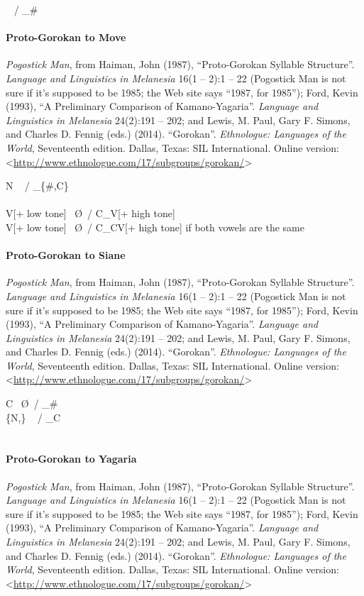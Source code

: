 \documentclass[11pt]{article}
\newcommand{\ipa}{\textipa}
\newcommand{\change}{\textrightarrow}
\begin{document}
\ipa{r} \change\ \ipa{P} / _\#

\paragraph{Proto-Gorokan to Move}{\it Pogostick Man}, from Haiman, John (1987), ``Proto-Gorokan Syllable Structure''. {\it Language and Linguistics in Melanesia} 16(1 -- 2):1 -- 22 (Pogostick Man is not sure if it's supposed to be 1985; the Web site says ``1987, for 1985''); Ford, Kevin (1993), ``A Preliminary Comparison of Kamano-Yagaria''. {\it Language and Linguistics in Melanesia} 24(2):191 -- 202; and Lewis, M. Paul, Gary F. Simons, and Charles D. Fennig (eds.) (2014). ``Gorokan''. {\it Ethnologue: Languages of the World}, Seventeenth edition. Dallas, Texas: SIL International. Online version: \textless\url{http://www.ethnologue.com/17/subgroups/gorokan/}\textgreater

N \change\ \ipa{P} / _\{\#,C\}\\
\ipa{Pv Pm Pg Pr Ph} \change\ \ipa{p b k t \{s,f\}}\\
V[+ low tone] \change\ \O\ / C_\ipa{h}V[+ high tone]\\
V[+ low tone] \change\ \O\ / C_CV[+ high tone] if both vowels are the same

\paragraph{Proto-Gorokan to Siane}{\it Pogostick Man}, from Haiman, John (1987), ``Proto-Gorokan Syllable Structure''. {\it Language and Linguistics in Melanesia} 16(1 -- 2):1 -- 22 (Pogostick Man is not sure if it's supposed to be 1985; the Web site says ``1987, for 1985''); Ford, Kevin (1993), ``A Preliminary Comparison of Kamano-Yagaria''. {\it Language and Linguistics in Melanesia} 24(2):191 -- 202; and Lewis, M. Paul, Gary F. Simons, and Charles D. Fennig (eds.) (2014). ``Gorokan''. {\it Ethnologue: Languages of the World}, Seventeenth edition. Dallas, Texas: SIL International. Online version: \textless\url{http://www.ethnologue.com/17/subgroups/gorokan/}\textgreater

C \change\ \O\ / _\#\\
\{N,\ipa{r}\} \change\ \ipa{P} / _C\\
\ipa{PNg Pd} \change\ \ipa{Nk t}

\paragraph{Proto-Gorokan to Yagaria}{\it Pogostick Man}, from Haiman, John (1987), ``Proto-Gorokan Syllable Structure''. {\it Language and Linguistics in Melanesia} 16(1 -- 2):1 -- 22 (Pogostick Man is not sure if it's supposed to be 1985; the Web site says ``1987, for 1985''); Ford, Kevin (1993), ``A Preliminary Comparison of Kamano-Yagaria''. {\it Language and Linguistics in Melanesia} 24(2):191 -- 202; and Lewis, M. Paul, Gary F. Simons, and Charles D. Fennig (eds.) (2014). ``Gorokan''. {\it Ethnologue: Languages of the World}, Seventeenth edition. Dallas, Texas: SIL International. Online version: \textless\url{http://www.ethnologue.com/17/subgroups/gorokan/}\textgreater
\end{document}
